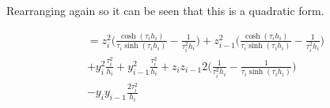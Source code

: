 \documentclass{article}
\begin{document}
Rearranging again so it can be seen that this is a quadratic form.

\begin{multline}
    = z_i^2 \biggl( \frac{\cosh(\tau_i h_i)}{\tau_i \sinh(\tau_i h_i)} -
    \frac{1}{\tau_i^2 h_i} \biggr) 
    + z_{i-1}^2 \biggl( \frac{\cosh(\tau_i h_i)}{\tau_i \sinh(\tau_i h_i)} -
    \frac{1}{\tau_i^2 h_i} \biggr) \\
    + y_i^2 \frac{\tau_i^2}{h_i} + y_{i-1}^2 \frac{\tau_i^2}{h_i} 
    + z_i z_{i-1} 2 \biggl( \frac{1}{\tau_i^2 h_i} - \frac{1}{\tau_i \sinh(\tau_i h_i)} \biggr) \\
    - y_i y_{i-1} \frac{2 \tau_i^2}{h_i}
\end{multline}
\end{document}
